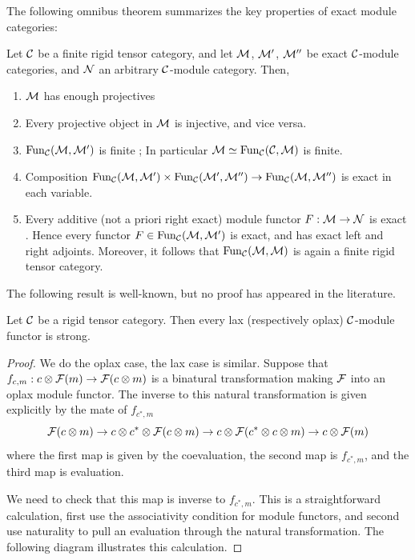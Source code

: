 \documentclass{amsart}
\begin{document}
The following omnibus theorem summarizes the key properties of exact module categories: 
\begin{theorem} \label{Thm:ExactModCatOmnibus}
	Let $\mathcal C$ be a finite rigid tensor category, and let $\mathcal M$, $\mathcal M'$, $\mathcal M''$ be exact $\mathcal C$-module categories, and $\mathcal N$ an arbitrary $\mathcal C$-module category. Then,
	\begin{enumerate}
		\item $\mathcal M$ has enough projectives \cite[Lemma 2.7.1]{EGNO}
		\item Every projective object in $\mathcal M$  is injective, and vice versa. \cite[Cor 2.7.4]{EGNO}
		\item $\operatorname{Fun}_{\mathcal C}(\mathcal M, \mathcal M')$ is finite \cite[Prop 2.13.5]{EGNO}; In particular $\mathcal M \simeq \operatorname{Fun}_{\mathcal C}(\mathcal C, \mathcal M)$ is finite.
		\item Composition $\operatorname{Fun}_{\mathcal C}(\mathcal M, \mathcal M') \times \operatorname{Fun}_{\mathcal C}(\mathcal M', \mathcal M'') \to \operatorname{Fun}_{\mathcal C}(\mathcal M, \mathcal M'')$ is exact in each variable. \cite[Lemma 2.13.2]{EGNO}		
		\item Every additive (not a priori right exact) module functor $F:\mathcal M \to \mathcal N$ is exact \cite[Prop 2.7.8]{EGNO}. Hence every functor $F \in \operatorname{Fun}_{\mathcal C}(\mathcal M, \mathcal M')$ is exact, and has exact left and right adjoints. Moreover, it follows that   $\operatorname{Fun}_{\mathcal C}(\mathcal M,\mathcal M)$ is again a finite rigid tensor category. 
	\end{enumerate}
\end{theorem}

The following result is well-known, but no proof has appeared in the literature.

\begin{lemma}
	Let $\mathcal C$ be a rigid tensor category. Then every lax (respectively oplax) $\mathcal C$-module functor is strong.  
\end{lemma}

\begin{proof}
We do the oplax case, the lax case is similar.  Suppose that $f_{c,m}:  c \otimes \mathcal F(m) \rightarrow \mathcal F(c \otimes m)$ is a binatural transformation making $\mathcal F$ into an oplax module functor.  The inverse to this natural transformation is given explicitly by the mate of $f_{c^*,m}$ 
$$\mathcal F(c \otimes m) \rightarrow c \otimes c^* \otimes \mathcal F(c \otimes m) \rightarrow c \otimes \mathcal F(c^* \otimes c \otimes m) \rightarrow c \otimes \mathcal F(m)$$
where the first map is given by the coevaluation, the second map is $f_{c^*,m}$, and the third map is evaluation.


We need to check that this map is inverse to $f_{c^*,m}$.  This is a straightforward calculation, first use the associativity condition for module functors, and second use naturality to pull an evaluation through the natural transformation.  The following diagram illustrates this calculation.

\end{proof}
\end{document}
